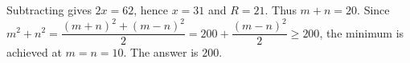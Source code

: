 Subtracting gives $2x=62$, hence $x=31$ and $R=21$. Thus $m+n=20$. Since $m^2+n^2=\dfrac{(m+n)^2+(m-n)^2}{2}=200+\dfrac{(m-n)^2}{2}\ge 200$, the minimum is achieved at $m=n=10$. The answer is $\boxed{200}$.
